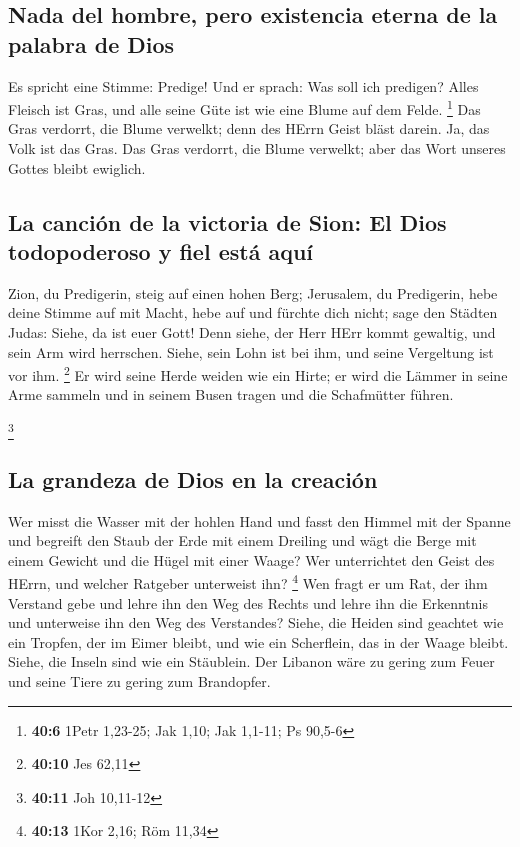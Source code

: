 \hypertarget{nada-del-hombre-pero-existencia-eterna-de-la-palabra-de-dios}{%
\subsection{Nada del hombre, pero existencia eterna de la palabra de
Dios}\label{nada-del-hombre-pero-existencia-eterna-de-la-palabra-de-dios}}

 Es spricht eine Stimme: Predige! Und er sprach: Was soll
ich predigen? Alles Fleisch ist Gras, und alle seine Güte ist wie eine
Blume auf dem Felde. \footnote{\textbf{40:6} 1Petr 1,23-25; Jak 1,10;
  Jak 1,1-11; Ps 90,5-6}  Das Gras verdorrt, die Blume
verwelkt; denn des HErrn Geist bläst darein. Ja, das Volk ist das Gras.
 Das Gras verdorrt, die Blume verwelkt; aber das Wort
unseres Gottes bleibt ewiglich.

\hypertarget{la-canciuxf3n-de-la-victoria-de-sion-el-dios-todopoderoso-y-fiel-estuxe1-aquuxed}{%
\subsection{La canción de la victoria de Sion: El Dios todopoderoso y
fiel está
aquí}\label{la-canciuxf3n-de-la-victoria-de-sion-el-dios-todopoderoso-y-fiel-estuxe1-aquuxed}}

 Zion, du Predigerin, steig auf einen hohen Berg;
Jerusalem, du Predigerin, hebe deine Stimme auf mit Macht, hebe auf und
fürchte dich nicht; sage den Städten Judas: Siehe, da ist euer Gott!
 Denn siehe, der Herr HErr kommt gewaltig, und sein Arm
wird herrschen. Siehe, sein Lohn ist bei ihm, und seine Vergeltung ist
vor ihm. \footnote{\textbf{40:10} Jes 62,11}  Er wird
seine Herde weiden wie ein Hirte; er wird die Lämmer in seine Arme
sammeln und in seinem Busen tragen und die Schafmütter führen.

\footnote{\textbf{40:11} Joh 10,11-12}

\hypertarget{la-grandeza-de-dios-en-la-creaciuxf3n}{%
\subsection{La grandeza de Dios en la
creación}\label{la-grandeza-de-dios-en-la-creaciuxf3n}}

 Wer misst die Wasser mit der hohlen Hand und fasst den
Himmel mit der Spanne und begreift den Staub der Erde mit einem Dreiling
und wägt die Berge mit einem Gewicht und die Hügel mit einer Waage?
 Wer unterrichtet den Geist des HErrn, und welcher
Ratgeber unterweist ihn? \footnote{\textbf{40:13} 1Kor 2,16; Röm 11,34}
 Wen fragt er um Rat, der ihm Verstand gebe und lehre ihn
den Weg des Rechts und lehre ihn die Erkenntnis und unterweise ihn den
Weg des Verstandes?  Siehe, die Heiden sind geachtet wie
ein Tropfen, der im Eimer bleibt, und wie ein Scherflein, das in der
Waage bleibt. Siehe, die Inseln sind wie ein Stäublein. 
Der Libanon wäre zu gering zum Feuer und seine Tiere zu gering zum
Brandopfer.

